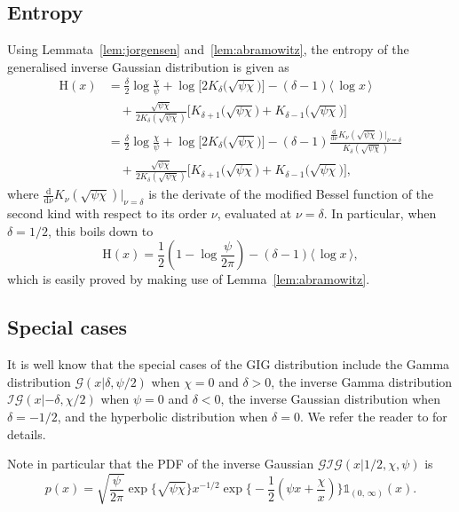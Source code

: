 \subsection{Entropy}

Using Lemmata~\ref{lem:jorgensen} and~\ref{lem:abramowitz}, the entropy of the generalised inverse Gaussian distribution is given as
\begin{align}
	\mathrm{H}(x)
	&= \frac{\delta}{2}\log\frac{\chi}{\psi} + \log\big[2K_{\delta}\big(\sqrt{\psi\chi}\big)\big] - (\delta-1)\langle\,\log x\,\rangle
	\nonumber \\
	& \quad + \frac{\sqrt{\psi\chi}}{2K_{\delta}(\sqrt{\psi\chi})}\big[K_{\delta+1}\big(\sqrt{\psi\chi}\big) + K_{\delta-1}\big(\sqrt{\psi\chi}\big)\big]
	\\	
	&= \frac{\delta}{2}\log\frac{\chi}{\psi} + \log\big[2K_{\delta}\big(\sqrt{\psi\chi}\big)\big] - (\delta-1)\frac{\frac{\mathrm{d}}{\mathrm{d}\nu}K_{\nu}(\sqrt{\psi\chi})\big|_{\nu=\delta}}{K_{\delta}(\sqrt{\psi\chi})}
	\nonumber \\
	& \quad + \frac{\sqrt{\psi\chi}}{2K_{\delta}(\sqrt{\psi\chi})}\big[K_{\delta+1}\big(\sqrt{\psi\chi}\big) + K_{\delta-1}\big(\sqrt{\psi\chi}\big)\big],
	\nonumber
\end{align}
where $\frac{\mathrm{d}}{\mathrm{d}\nu}K_{\nu}(\sqrt{\psi\chi})\big|_{\nu=\delta}$ is the derivate of the modified Bessel function of the second kind with respect to its order $\nu$, evaluated at $\nu=\delta$. In particular, when $\delta = 1/2$, this boils down to
\begin{equation}
\label{eq:gig-entropy}
	\mathrm{H}(x)
	= \frac{1}{2}\left(1 - \log\frac{\psi}{2\pi}\right) - (\delta-1)\langle\,\log x\,\rangle,
\end{equation}
which is easily proved by making use of Lemma~\ref{lem:abramowitz}.

\subsection{Special cases}

It is well know that the special cases of the GIG distribution include the Gamma distribution $\mathcal{G}(x|\delta, \psi/2)$ when $\chi = 0$ and $\delta > 0$, the inverse Gamma distribution $\mathcal{IG}(x|-\delta, \chi/2)$ when $\psi = 0$ and $\delta < 0$, the inverse Gaussian distribution when $\delta = -1/2$, and the hyperbolic distribution when $\delta = 0$. We refer the reader to \citep{jorgensen82} for details.

Note in particular that the PDF of the inverse Gaussian $\mathcal{GIG}(x|1/2, \chi, \psi)$ is
\begin{equation}
\label{eq:gig-pdf-for-delta-1/2}
	p(x)
	= \sqrt{\frac{\psi}{2\pi}}\exp\Big\{\sqrt{\psi\chi}\Big\}x^{-1/2}\exp\Big\{-\frac{1}{2}\left(\psi x + \frac{\chi}{x}\right)\Big\}\mathds{1}_{(0,\, \infty)}(x).
\end{equation}